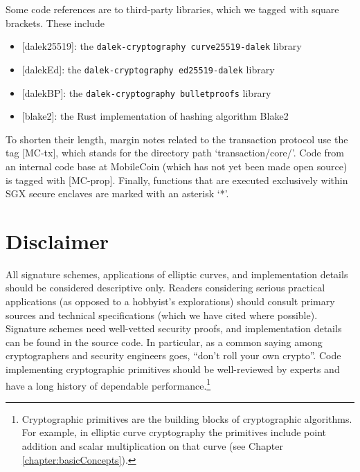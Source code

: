 Some code references are to third-party libraries, which we tagged with square brackets. These include
\begin{itemize}
    \item {[dalek25519]}: the {\tt dalek-cryptography curve25519-dalek} library \cite{dalek-curve25519-lib}
    \item {[dalekEd]}: the {\tt dalek-cryptography ed25519-dalek} library \cite{dalek-ed25519-lib}
    \item {[dalekBP]}: the {\tt dalek-cryptography bulletproofs} library \cite{dalek-bulletproofs-lib}
    \item {[blake2]}: the Rust implementation \cite{blake2-rust-lib} of hashing algorithm Blake2 \cite{blake-hashing-algorithm}
\end{itemize}

To shorten their length, margin notes related to the transaction protocol use the tag [MC-tx], which stands for the directory path `transaction/core/'. Code from an internal code base at MobileCoin (which has not yet been made open source) is tagged with [MC-prop]. Finally, functions that are executed exclusively within SGX secure enclaves are marked with an asterisk `*'.


\section{Disclaimer}

All signature schemes, applications of elliptic curves, and implementation details should be considered descriptive only. Readers considering serious practical applications (as opposed to a hobbyist's explorations) should consult primary sources and technical specifications (which we have cited where possible). Signature schemes need well-vetted security proofs, and implementation details can be found in the source code. In particular, as a common saying among cryptographers and security engineers goes, ``don't roll your own crypto''. Code implementing cryptographic primitives should be well-reviewed by experts and have a long history of dependable performance.\footnote{Cryptographic primitives are the building blocks of cryptographic algorithms. For example, in elliptic curve cryptography the primitives include point addition and scalar multiplication on that curve (see Chapter \ref{chapter:basicConcepts}).} %



